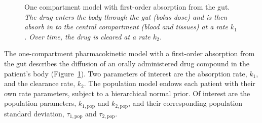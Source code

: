 \documentclass[stslayout, noinfoline]{imsart}
\theoremstyle{definition}
\begin{document}
 \begin{figure}
    \begin{center}
  \end{center}
  \caption{One compartment model with first-order absorption from the gut. \textit{The drug enters the body through the gut (bolus dose) and is then absorb in to the central compartment (blood and tissues) at a rate $k_1$. Over time, the drug is cleared at a rate $k_2$.}}
  \label{fig:oneCpt}
  \end{figure}

The one-compartment pharmacokinetic model with a first-order absorption from the gut describes the diffusion of an orally administered drug compound in the patient's body (Figure~\ref{fig:oneCpt}).
Two parameters of interest are the absorption rate, $k_1$, and the clearance rate, $k_2$.
The population model endows each patient with their own rate parameters,
subject to a hierarchical normal prior.
Of interest are the population parameters, $k_{1, \text{pop}}$ and $k_{2, \text{pop}}$,
and their corresponding population standard deviation, $\tau_{1, \text{pop}}$ and $\tau_{2, \text{pop}}$.
\end{document}
